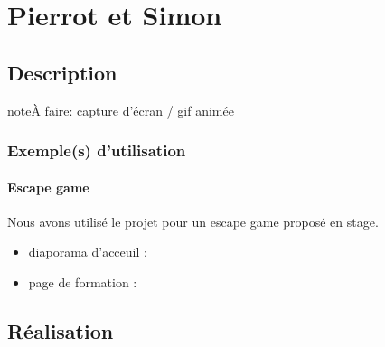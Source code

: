 \documentclass[letterpaper,10pt,french]{sphinxmanual}
\begin{document}


\section{Pierrot et Simon}
\label{\detokenize{projets/pierrot:projetpierrot}}\label{\detokenize{projets/pierrot:pierrot-et-simon}}\label{\detokenize{projets/pierrot::doc}}

\subsection{Description}
\label{\detokenize{projets/pierrot:description}}
\begin{sphinxadmonition}{note}{\label{projets/pierrot:index-0}À faire:}
capture d’écran / gif animée
\end{sphinxadmonition}


\subsubsection{Exemple(s) d’utilisation}
\label{\detokenize{projets/pierrot:exemple-s-d-utilisation}}

\paragraph{Escape game}
\label{\detokenize{projets/pierrot-exemple-escape:escape-game}}\label{\detokenize{projets/pierrot-exemple-escape::doc}}
Nous avons utilisé le projet  pour un escape
game proposé en stage.
\begin{itemize}
\item {} 
diaporama d’acceuil : 

\item {} 
page de formation : 

\end{itemize}

\noindent{}


\subsection{Réalisation}
\label{\detokenize{projets/pierrot:realisation}}
\end{document}
